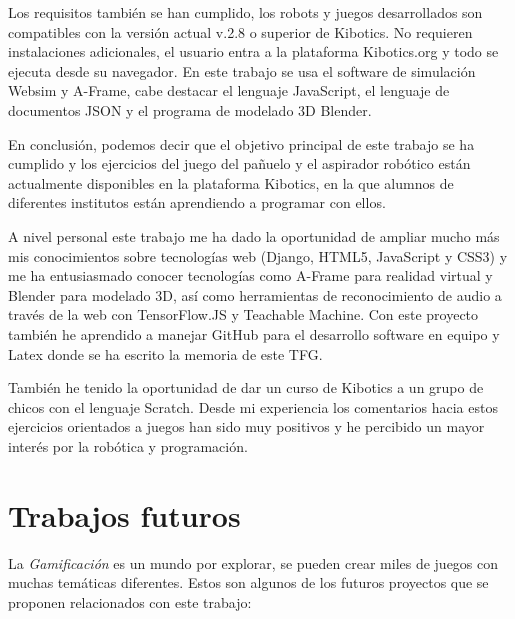 Los requisitos  también se han cumplido, los robots y juegos desarrollados son compatibles con la versión actual v.2.8 o superior de Kibotics. No requieren instalaciones adicionales, el usuario entra a la plataforma Kibotics.org y todo se ejecuta desde su navegador.  En este trabajo se usa el software de simulación Websim y A-Frame, cabe destacar el lenguaje JavaScript, el lenguaje de documentos JSON y el programa de modelado 3D Blender.

En conclusión,  podemos decir que el objetivo principal de este trabajo se ha cumplido y los ejercicios del juego del pañuelo y el aspirador robótico están actualmente disponibles en la plataforma Kibotics, en la que alumnos de diferentes institutos están aprendiendo a programar con ellos.

A nivel personal este trabajo me ha dado la oportunidad de ampliar mucho más mis conocimientos sobre tecnologías web (Django, HTML5, JavaScript y CSS3) y me ha entusiasmado conocer tecnologías como A-Frame para realidad virtual y Blender para modelado 3D, así como herramientas de reconocimiento de audio a través de la web con TensorFlow.JS y Teachable Machine.
Con este proyecto también he aprendido a manejar GitHub para el desarrollo software en equipo y Latex donde se ha escrito la memoria de este TFG.

También he tenido la oportunidad de dar un curso de Kibotics a un grupo de chicos con el lenguaje Scratch. Desde mi experiencia los comentarios hacia estos ejercicios orientados a juegos han sido muy positivos y he percibido un mayor interés por la robótica y programación.

    
\section{Trabajos futuros}

La \textit{Gamificación} es un mundo por explorar, se pueden crear miles de juegos con muchas temáticas diferentes. Estos son algunos de los futuros proyectos que se proponen relacionados con este trabajo:

